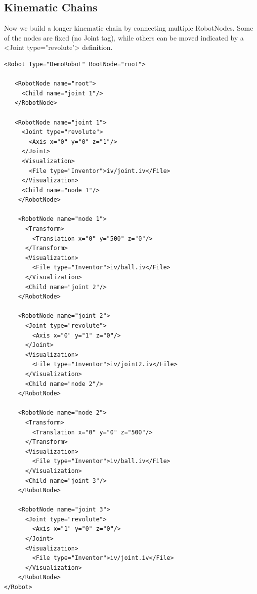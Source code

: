 \documentclass{book}
\begin{document}
\subsection{Kinematic Chains}
\par
Now we build a longer kinematic chain by connecting multiple RobotNodes. Some of the nodes are fixed (no Joint tag), while others can be moved indicated by a <Joint type="revolute'> definition. 
\par
\begin{lstlisting}
<Robot Type="DemoRobot" RootNode="root">

   <RobotNode name="root">
     <Child name="joint 1"/>
   </RobotNode>

   <RobotNode name="joint 1">
     <Joint type="revolute">
       <Axis x="0" y="0" z="1"/>
     </Joint>
     <Visualization>
       <File type="Inventor">iv/joint.iv</File>
     </Visualization>
     <Child name="node 1"/>
    </RobotNode>

    <RobotNode name="node 1">
      <Transform>
        <Translation x="0" y="500" z="0"/>
      </Transform>
      <Visualization>
        <File type="Inventor">iv/ball.iv</File>
      </Visualization>
      <Child name="joint 2"/>
    </RobotNode>

    <RobotNode name="joint 2">
      <Joint type="revolute">
        <Axis x="0" y="1" z="0"/>
      </Joint>
      <Visualization>
        <File type="Inventor">iv/joint2.iv</File>
      </Visualization>
      <Child name="node 2"/>
    </RobotNode>

    <RobotNode name="node 2">
      <Transform>
        <Translation x="0" y="0" z="500"/>
      </Transform>
      <Visualization>
        <File type="Inventor">iv/ball.iv</File>
      </Visualization>
      <Child name="joint 3"/>
    </RobotNode>

    <RobotNode name="joint 3">
      <Joint type="revolute">
        <Axis x="1" y="0" z="0"/>
      </Joint>
      <Visualization>
        <File type="Inventor">iv/joint.iv</File>
      </Visualization>
    </RobotNode> 
</Robot>
\end{lstlisting}
\par
\end{document}
